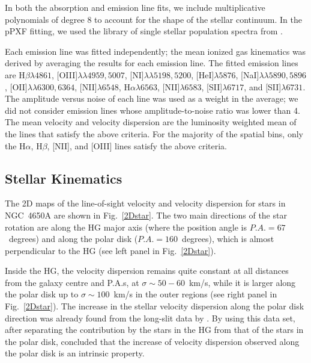 \documentclass{aa}
\begin{document}
In both the absorption and emission line fits, we include
multiplicative polynomials of degree 8 to account for the shape of the
stellar continuum.  In the pPXF fitting, we used the library of single
stellar population spectra from \citet{Vazdekis+12}.

Each emission line was fitted independently; the mean ionized gas
kinematics was derived by averaging the results for each emission
line. The fitted emission lines are
H$\beta\lambda 4861$, [OIII]$\lambda\lambda 4959,5007$,
[NI]$\lambda\lambda 5198,5200$, [HeI]$\lambda 5876$,
[NaI]$\lambda\lambda 5890,5896$, [OII]$\lambda\lambda 6300,6364$,
[NII]$\lambda 6548$, H$\alpha\lambda 6563$, [NII]$\lambda 6583$,
[SII]$\lambda 6717$, and [SII]$\lambda 6731$.
The amplitude versus noise of each line was used as a weight in
the average;  we did not consider emission lines whose amplitude-to-noise ratio was lower than 4. The mean velocity and velocity dispersion are the luminosity
weighted mean of the lines that satisfy the above criteria.  For the
majority of the spatial bins, only the H$\alpha$, H$\beta$, [NII], and [OIII] lines
satisfy the above criteria.



\subsection{Stellar Kinematics}\label{star}

The 2D maps of the line-of-sight velocity and
velocity dispersion for stars in NGC~4650A are shown in
Fig.~\ref{2Dstar}.  The two main directions of the star rotation are
along the HG major axis (where the position angle is $P.A.=67$~degrees) and along the polar disk
($P.A.=160$~degrees), which is almost perpendicular to the HG (see
left panel in Fig.~\ref{2Dstar}).  

Inside the HG, the velocity dispersion remains quite constant at all distances
  from the galaxy centre and P.A.s, at
  $\sigma \sim 50 - 60$~km/s, while it is larger along the polar disk
  up to $\sigma \sim 100$~km/s in the outer regions (see right panel
  in Fig.~\ref{2Dstar}).  The increase in the stellar velocity
  dispersion along the polar disk direction was already found from the
  long-slit data by \citet{Iod06}. By using this data set, after
  separating the contribution by the stars in the HG from that of the
  stars in the polar disk, \citet{Coccato2014} concluded that the
  increase of velocity dispersion observed along the polar disk is an
  intrinsic property.
\end{document}
